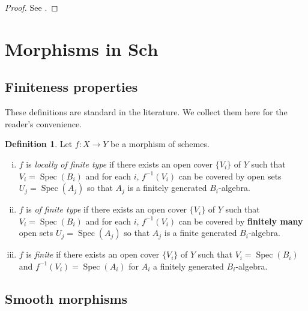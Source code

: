 \documentclass{amsart}
\newcommand{\Sch}{\mathbf{Sch}}
\DeclareMathOperator{\Spec}{Spec}
\theoremstyle{definition}
\newtheorem{definition}[theorem]{Definition}
\theoremstyle{remark}
\begin{document}
\begin{proof}
    See \cite[\href{https://stacks.math.columbia.edu/tag/03OG}{Tag
        03OG}]{stacks-project}.
\end{proof}

\section{Morphisms in $\Sch$}

\subsection{Finiteness properties}

These definitions are standard in the literature. We collect them here for the
reader's convenience.

\begin{definition}
    Let $f : X \to Y$ be a morphism of schemes.

    \begin{enumerate}[(i)]
        \item $f$ is \textit{locally of finite type} if there exists an open
            cover $\{V_i\}$ of $Y$ such that $V_i = \Spec(B_i)$ and for each
            $i$, $f^{-1}(V_i)$ can be covered by open sets $U_j = \Spec(A_j)$ so
            that $A_j$ is a finitely generated $B_i$-algebra.

        \item $f$ is \textit{of finite type} if there exists an open cover
            $\{V_i\}$ of $Y$ such that $V_i = \Spec(B_i)$ and for each $i$,
            $f^{-1}(V_i)$ can be covered by \textbf{finitely many} open sets
            $U_j = \Spec(A_j)$ so that $A_j$ is a finite generated
            $B_i$-algebra.

        \item $f$ is \textit{finite} if there exists an open cover $\{V_i\}$ of
            $Y$ such that $V_i = \Spec(B_i)$ and $f^{-1}(V_i) = \Spec(A_i)$ for
            $A_i$ a finitely generated $B_i$-algebra.
    \end{enumerate}
\end{definition}

\subsection{Smooth morphisms}
\end{document}
